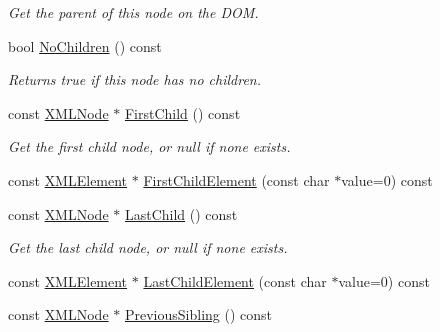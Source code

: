 \begin{DoxyCompactItemize}
\begin{DoxyCompactList}\small\item\em Get the parent of this node on the D\-O\-M. \end{DoxyCompactList}\item 
\hypertarget{classtinyxml2_1_1_x_m_l_node_a0b5f0d92629f576c8e5f5f48b2edee19}{bool \hyperlink{classtinyxml2_1_1_x_m_l_node_a0b5f0d92629f576c8e5f5f48b2edee19}{No\-Children} () const }\label{classtinyxml2_1_1_x_m_l_node_a0b5f0d92629f576c8e5f5f48b2edee19}

\begin{DoxyCompactList}\small\item\em Returns true if this node has no children. \end{DoxyCompactList}\item 
\hypertarget{classtinyxml2_1_1_x_m_l_node_a8483a78edd9360086407c20336f05968}{const \hyperlink{classtinyxml2_1_1_x_m_l_node}{X\-M\-L\-Node} $\ast$ \hyperlink{classtinyxml2_1_1_x_m_l_node_a8483a78edd9360086407c20336f05968}{First\-Child} () const }\label{classtinyxml2_1_1_x_m_l_node_a8483a78edd9360086407c20336f05968}

\begin{DoxyCompactList}\small\item\em Get the first child node, or null if none exists. \end{DoxyCompactList}\item 
const \hyperlink{classtinyxml2_1_1_x_m_l_element}{X\-M\-L\-Element} $\ast$ \hyperlink{classtinyxml2_1_1_x_m_l_node_aec1b6ff2abafa171238528e578473568}{First\-Child\-Element} (const char $\ast$value=0) const 
\item 
\hypertarget{classtinyxml2_1_1_x_m_l_node_ac28a8c20593515b2d5bf611bf5307d45}{const \hyperlink{classtinyxml2_1_1_x_m_l_node}{X\-M\-L\-Node} $\ast$ \hyperlink{classtinyxml2_1_1_x_m_l_node_ac28a8c20593515b2d5bf611bf5307d45}{Last\-Child} () const }\label{classtinyxml2_1_1_x_m_l_node_ac28a8c20593515b2d5bf611bf5307d45}

\begin{DoxyCompactList}\small\item\em Get the last child node, or null if none exists. \end{DoxyCompactList}\item 
const \hyperlink{classtinyxml2_1_1_x_m_l_element}{X\-M\-L\-Element} $\ast$ \hyperlink{classtinyxml2_1_1_x_m_l_node_ab3ede38f8f25e26ad6cb118542737fc8}{Last\-Child\-Element} (const char $\ast$value=0) const 
\item 
\hypertarget{classtinyxml2_1_1_x_m_l_node_ae059bb077fd67b81c8cf1c67657647e4}{const \hyperlink{classtinyxml2_1_1_x_m_l_node}{X\-M\-L\-Node} $\ast$ \hyperlink{classtinyxml2_1_1_x_m_l_node_ae059bb077fd67b81c8cf1c67657647e4}{Previous\-Sibling} () const }\label{classtinyxml2_1_1_x_m_l_node_ae059bb077fd67b81c8cf1c67657647e4}


\end{DoxyCompactItemize}
